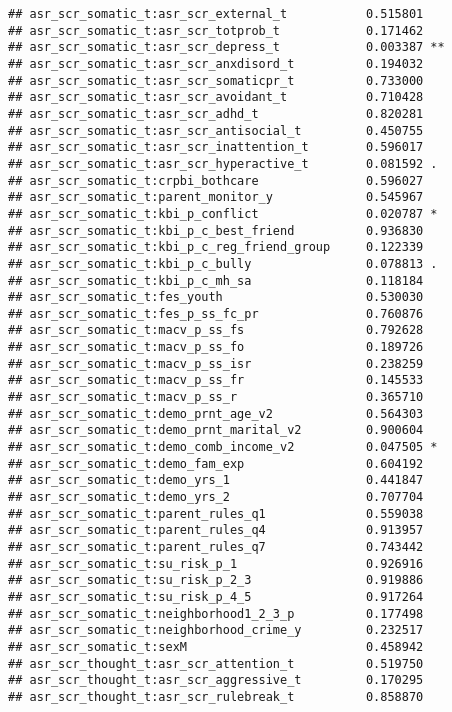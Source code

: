 \documentclass[
]{article}
\begin{document}
\begin{verbatim}
## asr_scr_somatic_t:asr_scr_external_t           0.515801    
## asr_scr_somatic_t:asr_scr_totprob_t            0.171462    
## asr_scr_somatic_t:asr_scr_depress_t            0.003387 ** 
## asr_scr_somatic_t:asr_scr_anxdisord_t          0.194032    
## asr_scr_somatic_t:asr_scr_somaticpr_t          0.733000    
## asr_scr_somatic_t:asr_scr_avoidant_t           0.710428    
## asr_scr_somatic_t:asr_scr_adhd_t               0.820281    
## asr_scr_somatic_t:asr_scr_antisocial_t         0.450755    
## asr_scr_somatic_t:asr_scr_inattention_t        0.596017    
## asr_scr_somatic_t:asr_scr_hyperactive_t        0.081592 .  
## asr_scr_somatic_t:crpbi_bothcare               0.596027    
## asr_scr_somatic_t:parent_monitor_y             0.545967    
## asr_scr_somatic_t:kbi_p_conflict               0.020787 *  
## asr_scr_somatic_t:kbi_p_c_best_friend          0.936830    
## asr_scr_somatic_t:kbi_p_c_reg_friend_group     0.122339    
## asr_scr_somatic_t:kbi_p_c_bully                0.078813 .  
## asr_scr_somatic_t:kbi_p_c_mh_sa                0.118184    
## asr_scr_somatic_t:fes_youth                    0.530030    
## asr_scr_somatic_t:fes_p_ss_fc_pr               0.760876    
## asr_scr_somatic_t:macv_p_ss_fs                 0.792628    
## asr_scr_somatic_t:macv_p_ss_fo                 0.189726    
## asr_scr_somatic_t:macv_p_ss_isr                0.238259    
## asr_scr_somatic_t:macv_p_ss_fr                 0.145533    
## asr_scr_somatic_t:macv_p_ss_r                  0.365710    
## asr_scr_somatic_t:demo_prnt_age_v2             0.564303    
## asr_scr_somatic_t:demo_prnt_marital_v2         0.900604    
## asr_scr_somatic_t:demo_comb_income_v2          0.047505 *  
## asr_scr_somatic_t:demo_fam_exp                 0.604192    
## asr_scr_somatic_t:demo_yrs_1                   0.441847    
## asr_scr_somatic_t:demo_yrs_2                   0.707704    
## asr_scr_somatic_t:parent_rules_q1              0.559038    
## asr_scr_somatic_t:parent_rules_q4              0.913957    
## asr_scr_somatic_t:parent_rules_q7              0.743442    
## asr_scr_somatic_t:su_risk_p_1                  0.926916    
## asr_scr_somatic_t:su_risk_p_2_3                0.919886    
## asr_scr_somatic_t:su_risk_p_4_5                0.917264    
## asr_scr_somatic_t:neighborhood1_2_3_p          0.177498    
## asr_scr_somatic_t:neighborhood_crime_y         0.232517    
## asr_scr_somatic_t:sexM                         0.458942    
## asr_scr_thought_t:asr_scr_attention_t          0.519750    
## asr_scr_thought_t:asr_scr_aggressive_t         0.170295    
## asr_scr_thought_t:asr_scr_rulebreak_t          0.858870    

\end{verbatim}
\end{document}
